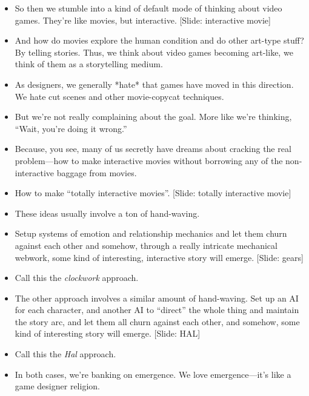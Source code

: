 \documentclass[12pt]{article}
\begin{document}
{\begin{itemize}
\item So then we stumble into a kind of default mode of thinking about video games.  They're like movies, but interactive.  [Slide: interactive movie]

\item And how do movies explore the human condition and do other art-type stuff?  By telling stories.  Thus, we think about video games becoming art-like, we think of them as a storytelling medium.

\item As designers, we generally *hate* that games have moved in this direction.  We hate cut scenes and other movie-copycat techniques.

\item But we're not really complaining about the goal.  More like we're thinking, ``Wait, you're doing it wrong.''

\item Because, you see, many of us secretly have dreams about cracking the real problem---how to make interactive movies without borrowing any of the non-interactive baggage from movies.  

\item How to make ``totally interactive movies''. [Slide: totally interactive movie]


\item These ideas usually involve a ton of hand-waving.  

\item Setup systems of emotion and relationship mechanics and let them churn against each other and somehow, through a really intricate mechanical webwork, some kind of interesting, interactive story will emerge.  [Slide:  gears]

\item Call this the {\it clockwork} approach.

\item The other approach involves a similar amount of hand-waving.  Set up an AI for each character, and another AI to ``direct'' the whole thing and maintain the story arc, and let them all churn against each other, and somehow, some kind of interesting story will emerge.  [Slide:  HAL] 

\item Call this the {\it Hal} approach.

\item In both cases, we're banking on emergence.  We love emergence---it's like a game designer religion.


\end{itemize}}
\end{document}
